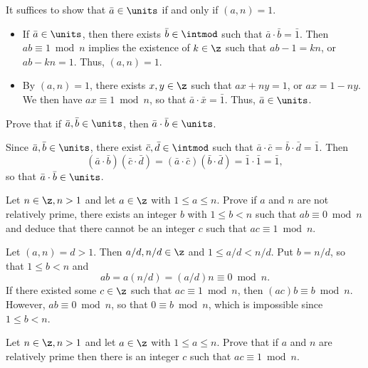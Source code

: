 \begin{sol}
    It suffices to show that $\bar a \in \units$ if and only if $(a, n) = 1$.
    \begin{itemize}
        \item[\rightimp] If $\bar a \in \units$, then there exists $\bar b \in \intmod$ such that $\bar a \cdot \bar b = \bar 1$. Then $ab \equiv 1 \bmod n$ implies the existence of $k \in \z$ such that $ab - 1 = kn$, or $ab - kn = 1$. Thus, $(a, n) = 1$.
        \item[\leftimp] By $(a, n) = 1$, there exists $x, y \in \z$ such that $ax + ny = 1$, or $ax = 1 - ny$. We then have $ax \equiv 1 \bmod n$, so that $\bar a \cdot \bar x = \bar 1$. Thus, $\bar a \in \units$. \qh
    \end{itemize}
\end{sol}

\begin{exercise}\label{ex0.3.11}
    Prove that if $\bar a, \bar b \in \units$, then $\bar a \cdot \bar b \in \units$.
\end{exercise}

\begin{sol}
    Since $\bar a, \bar b \in \units$, there exist $\bar c, \bar d \in \intmod$ such that $\bar a \cdot \bar c = \bar b \cdot \bar d = \bar 1$. Then
    \[(\bar a \cdot \bar b)(\bar c \cdot \bar d) = (\bar a \cdot \bar c)(\bar b \cdot \bar d) = \bar 1 \cdot \bar 1 = \bar 1,\]
    so that $\bar a \cdot \bar b \in \units$.
\end{sol}

\begin{exercise}\label{ex0.3.12}
    Let $n \in \z, n > 1$ and let $a \in \z$ with $1 \leq a \leq n$. Prove if $a$ and $n$ are not relatively prime, there exists an integer $b$ with $1 \leq b < n$ such that $ab \equiv 0 \bmod n$ and deduce that there cannot be an integer $c$ such that $ac \equiv 1 \bmod n$.
\end{exercise}

\begin{sol}
    Let $(a, n) = d > 1$. Then $a/d, n/d \in \z$ and $1 \leq a/d < n/d$. Put $b = n/d$, so that $1 \leq b < n$ and
    \[ab = a(n/d) = (a/d)n \equiv 0 \bmod n.\]
    If there existed some $c \in \z$ such that $ac \equiv 1 \bmod n$, then $(ac)b \equiv b \bmod n$. However, $ab \equiv 0 \bmod n$, so that $0 \equiv b \bmod n$, which is impossible since $1 \leq b < n$.
\end{sol}

\begin{exercise}\label{ex0.3.13}
    Let $n \in \z, n > 1$ and let $a \in \z$ with $1 \leq a \leq n$. Prove that if $a$ and $n$ are relatively prime then there is an integer $c$ such that $ac \equiv 1 \bmod n$.

\end{exercise}

